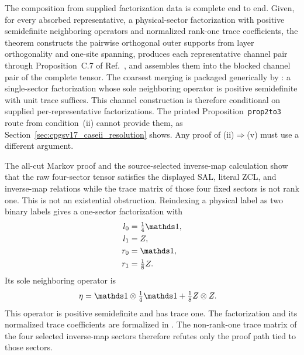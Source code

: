 \documentclass{article}
\begin{document}
The composition from supplied factorization data is complete end to end.
Given, for every absorbed representative, a physical-sector factorization
with positive semidefinite neighboring operators and normalized rank-one trace
coefficients, the theorem
 constructs the pairwise orthogonal outer supports from
layer orthogonality and one-site spanning, produces each representative
channel pair through Proposition~C.7 of
Ref.~\cite{Cirac2016MPDO_arXiv}, and assembles them into the blocked channel
pair of the complete tensor. The coarsest merging is packaged generically by
: a single-sector factorization whose sole neighboring operator is
positive semidefinite with unit trace suffices. This channel construction is
therefore conditional on supplied per-representative factorizations. The
printed Proposition~\texttt{prop2to3} route from condition~(ii) cannot provide
them, as Section~\ref{sec:cpgsv17_caseii_resolution} shows. Any proof of
(ii)$\Rightarrow$(v) must use a different argument.

The all-cut Markov proof and the source-selected inverse-map calculation show
that the raw four-sector tensor satisfies the displayed SAL, literal ZCL, and
inverse-map relations while the trace matrix of those four fixed sectors is
not rank one. This is not an existential obstruction. Reindexing a physical
label as two binary labels gives a one-sector factorization with
\begin{align}
    l_0
        &= \tfrac14\Id,
    \label{eq:cpgsv17_one_sector_left_identity}\\
    l_1
        &= Z,
    \label{eq:cpgsv17_one_sector_left_pauli}\\
    r_0
        &= \Id,
    \label{eq:cpgsv17_one_sector_right_identity}\\
    r_1
        &= \tfrac18Z.
    \label{eq:cpgsv17_one_sector_right_pauli}
\end{align}
Its sole neighboring operator is
\begin{align}
    \eta
        &= \Id\otimes\tfrac14\Id
           +\tfrac18Z\otimes Z.
    \label{eq:cpgsv17_one_sector_neighboring_operator}
\end{align}
This operator is positive semidefinite and has trace one. The factorization
and its normalized trace coefficients are formalized in
. The non-rank-one trace matrix
of the four selected inverse-map sectors therefore refutes only the proof path
tied to those sectors.
\end{document}
